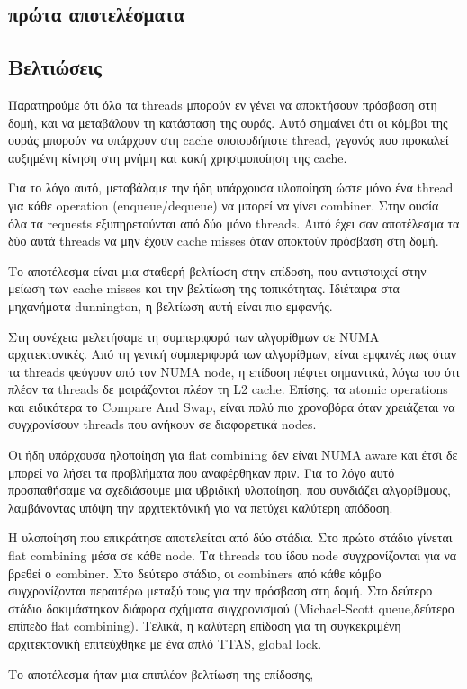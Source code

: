 \subsection{πρώτα αποτελέσματα}
\subsection{Βελτιώσεις}
Παρατηρούμε ότι όλα τα \textlatin{threads} μπορούν εν γένει να αποκτήσουν πρόσβαση στη δομή, και να μεταβάλουν τη κατάσταση της ουράς. Αυτό σημαίνει ότι οι κόμβοι της ουράς μπορούν να υπάρχουν στη \textlatin{cache} οποιουδήποτε \textlatin{thread}, γεγονός που προκαλεί αυξημένη κίνηση στη μνήμη και κακή χρησιμοποίηση της \textlatin{cache}. 

Για το λόγο αυτό, μεταβάλαμε την ήδη υπάρχουσα υλοποίηση ώστε μόνο ένα \textlatin{thread} για κάθε \textlatin{operation (enqueue/dequeue)} να μπορεί να γίνει combiner. Στην ουσία όλα τα \textlatin{requests} εξυπηρετούνται από δύο μόνο \textlatin{threads}. Aυτό έχει σαν αποτέλεσμα τα δύο αυτά \textlatin{threads} να μην έχουν \textlatin{cache misses} όταν αποκτούν πρόσβαση στη δομή.

Το αποτέλεσμα είναι μια σταθερή βελτίωση στην επίδοση, που αντιστοιχεί στην μείωση των \textlatin{cache misses} και την βελτίωση της τοπικότητας. Ιδιέταιρα στα μηχανήματα dunnington, η βελτίωση αυτή είναι πιο εμφανής.

Στη συνέχεια μελετήσαμε τη συμπεριφορά των αλγορίθμων σε \textlatin{NUMA} αρχιτεκτονικές. Από τη γενική συμπεριφορά των αλγορίθμων, είναι εμφανές πως όταν τα \textlatin{threads} φεύγουν από τον \textlatin{NUMA node}, η επίδοση πέφτει σημαντικά, λόγω του ότι πλέον τα \textlatin{threads} δε μοιράζονται πλέον τη \textlatin{L2 cache}. Επίσης, τα \textlatin{atomic operations} και ειδικότερα το \textlatin{Compare And Swap}, είναι πολύ πιο χρονοβόρα όταν χρειάζεται να συγχρονίσουν \textlatin{threads} που ανήκουν σε διαφορετικά \textlatin{nodes}.

Οι ήδη υπάρχουσα ηλοποίηση για \textlatin{flat combining} δεν είναι \textlatin{NUMA aware} και έτσι δε μπορεί να λήσει τα προβλήματα που αναφέρθηκαν πριν. Για το λόγο αυτό προσπαθήσαμε να σχεδιάσουμε μια υβριδική υλοποίηση, που συνδιάζει αλγορίθμους, λαμβάνοντας υπόψη την αρχιτεκτόνική για να πετύχει καλύτερη απόδοση.

Η υλοποίηση που επικράτησε αποτελείται από δύο στάδια. Στο πρώτο στάδιο γίνεται \textlatin{flat combining} μέσα σε κάθε \textlatin{node}. Τα \textlatin{threads} του ίδου \textlatin{node} συγχρονίζονται για να βρεθεί ο \textlatin{combiner}. Στο δεύτερο στάδιο, οι \textlatin{combiners} από κάθε κόμβο συγχρονίζονται περαιτέρω μεταξύ τους για την πρόσβαση στη δομή. Στο δεύτερο στάδιο δοκιμάστηκαν διάφορα σχήματα συγχρονισμού (\textlatin{Michael-Scott queue},δεύτερο επίπεδο \textlatin{flat combining}). Τελικά, η καλύτερη επίδοση για τη συγκεκριμένη αρχιτεκτονική επιτεύχθηκε με ένα απλό \textlatin{TTAS, global lock}.

Το αποτέλεσμα ήταν μια επιπλέον βελτίωση της επίδοσης,
